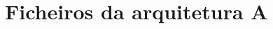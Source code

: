 \chapter{Ficheiros da arquitetura A} \label{ap2:codigo}



%
%
%
%
%
%
%
%
%
%
%
%
%
%
%
%
%
%
%
%
%
%	
%	
%	
%	
%	
%	
%	
%	
%
%
%
%
%
%
%
%
%
%
%
%
%
%
%
